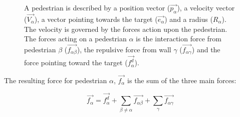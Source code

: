 \begin{figure}[ht]
    \centering
    \caption[Notation for pedestrians]{
     A pedestrian is described by a position
    vector ($ \overrightarrow{p_{\alpha}} $), a velocity vector ($
    \overrightarrow{V_{\alpha}} $), a vector pointing towards the target
    ($\overrightarrow{e_{\alpha}}$)  and a radius ($ R_{\alpha} $). The velocity is governed by the forces action upon the pedestrian.\\
     The forces acting on a pedestrian $\alpha$ is the
    interaction force from pedestrian $\beta$
    ($\overrightarrow{f_{\alpha\beta}}$), the repulsive force from wall $\gamma$
    ($\overrightarrow{f_{\alpha \gamma}}$) and the force pointing toward the target ($\overrightarrow{f^{d}_{\alpha}}$).}

    \label{pedestrian-notation}
\end{figure}

The resulting force for pedestrian $\alpha$, $\overrightarrow{f_{\alpha}}$ is
the sum of the three main forces:

\begin{equation}\label{model}
    \overrightarrow{f_{\alpha}} = \overrightarrow{f^{d}_{\alpha}} +
    \sum_{\beta \neq \alpha} \overrightarrow{f_{\alpha \beta}} +
    \sum_{\gamma} \overrightarrow{f_{\alpha \gamma}}
\end{equation}

